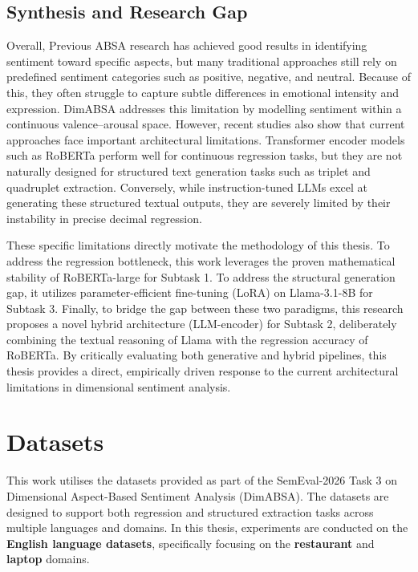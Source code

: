 \documentclass{article}
\begin{document}
\subsection{Synthesis and Research Gap}
\label{subsec:synthesis}

Overall, Previous ABSA research has achieved good results in identifying sentiment toward specific aspects, but many traditional approaches still rely on predefined sentiment categories such as positive, negative, and neutral. Because of this, they often struggle to capture subtle differences in emotional intensity and expression. DimABSA addresses this limitation by modelling sentiment within a continuous valence–arousal space. However, recent studies also show that current approaches face important architectural limitations. Transformer encoder models such as RoBERTa perform well for continuous regression tasks, but they are not naturally designed for structured text generation tasks such as triplet and quadruplet extraction. Conversely, while instruction-tuned LLMs excel at generating these structured textual outputs, they are severely limited by their instability in precise decimal regression. 

These specific limitations directly motivate the methodology of this thesis. To address the regression bottleneck, this work leverages the proven mathematical stability of RoBERTa-large for Subtask 1. To address the structural generation gap, it utilizes parameter-efficient fine-tuning (LoRA) on Llama-3.1-8B for Subtask 3. Finally, to bridge the gap between these two paradigms, this research proposes a novel hybrid architecture (LLM-encoder) for Subtask 2, deliberately combining the textual reasoning of Llama with the regression accuracy of RoBERTa. By critically evaluating both generative and hybrid pipelines, this thesis provides a direct, empirically driven response to the current architectural limitations in dimensional sentiment analysis.

\section{Datasets}
\label{sec:datasets}

This work utilises the datasets provided as part of the SemEval-2026 Task 3 on Dimensional Aspect-Based Sentiment Analysis (DimABSA). The datasets are designed to support both regression and structured extraction tasks across multiple languages and domains. In this thesis, experiments are conducted on the \textbf{English language datasets}, specifically focusing on the \textbf{restaurant} and \textbf{laptop} domains.
\end{document}
